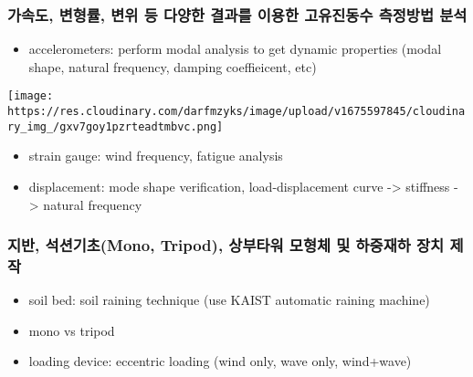 \documentclass[
  letterpaper,
  DIV=11,
  numbers=noendperiod]{scrreprt}
\providecommand{\tightlist}{%
  \setlength{\itemsep}{0pt}\setlength{\parskip}{0pt}}\usepackage{longtable,booktabs,array}
\begin{document}
\hypertarget{uxac00uxc18duxb3c4-uxbcc0uxd615uxb960-uxbcc0uxc704-uxb4f1-uxb2e4uxc591uxd55c-uxacb0uxacfcuxb97c-uxc774uxc6a9uxd55c-uxace0uxc720uxc9c4uxb3d9uxc218-uxce21uxc815uxbc29uxbc95-uxbd84uxc11d}{%
\subsubsection{가속도, 변형률, 변위 등 다양한 결과를 이용한 고유진동수
측정방법
분석}\label{uxac00uxc18duxb3c4-uxbcc0uxd615uxb960-uxbcc0uxc704-uxb4f1-uxb2e4uxc591uxd55c-uxacb0uxacfcuxb97c-uxc774uxc6a9uxd55c-uxace0uxc720uxc9c4uxb3d9uxc218-uxce21uxc815uxbc29uxbc95-uxbd84uxc11d}}

\begin{itemize}
\tightlist
\item
  accelerometers: perform modal analysis to get dynamic properties
  (modal shape, natural frequency, damping coeffieicent, etc)
\end{itemize}

\texttt{[image: https://res.cloudinary.com/darfmzyks/image/upload/v1675597845/cloudinary\_img\_/gxv7goy1pzrteadtmbvc.png]}

\begin{itemize}
\item
  strain gauge: wind frequency, fatigue analysis
\item
  displacement: mode shape verification, load-displacement curve
  -\textgreater{} stiffness -\textgreater{} natural frequency
\end{itemize}

\hypertarget{uxc9c0uxbc18-uxc11duxc158uxae30uxcd08mono-tripod-uxc0c1uxbd80uxd0c0uxc6cc-uxbaa8uxd615uxccb4-uxbc0f-uxd558uxc911uxc7acuxd558-uxc7a5uxce58-uxc81cuxc791}{%
\subsubsection{지반, 석션기초(Mono, Tripod), 상부타워 모형체 및 하중재하
장치
제작}\label{uxc9c0uxbc18-uxc11duxc158uxae30uxcd08mono-tripod-uxc0c1uxbd80uxd0c0uxc6cc-uxbaa8uxd615uxccb4-uxbc0f-uxd558uxc911uxc7acuxd558-uxc7a5uxce58-uxc81cuxc791}}

\begin{itemize}
\item
  soil bed: soil raining technique (use KAIST automatic raining machine)
\item
  mono vs tripod
\item
  loading device: eccentric loading (wind only, wave only, wind+wave)
\end{itemize}
\end{document}
